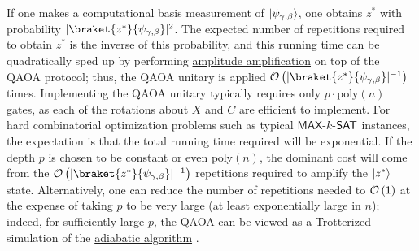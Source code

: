 \begin{refsection}
\begin{itemize}
If one makes a computational basis measurement of $\lvert\psi_{\gamma,\beta}\rangle$, one obtains $z^*$ with probability $|\braket{z^*}{\psi_{\gamma,\beta}}|^2$. The expected number of repetitions required to obtain $z^*$ is the inverse of this probability, and this running time can be quadratically sped up by performing \hyperref[prim:AmpAmp]{amplitude amplification} on top of the QAOA protocol; thus, the QAOA unitary is applied $\bigO{|\braket{z^*}{\psi_{\gamma,\beta}}|^{-1}}$ times. Implementing the QAOA unitary typically requires only $p \cdot \mathrm{poly}(n)$ gates, as each of the rotations about $X$ and $C$ are efficient to implement. For hard combinatorial optimization problems such as typical $\mathsf{MAX}$-$k$-$\mathsf{SAT}$ instances, the expectation is that the total running time required will be exponential. If the depth $p$ is chosen to be constant or even $\mathrm{poly}(n)$, the dominant cost will come from the $\bigO{|\braket{z^*}{\psi_{\gamma,\beta}}|^{-1}}$ repetitions required to amplify the $\lvert z^*\rangle$ state. Alternatively, one can reduce the number of repetitions needed to $\mathcal{O}\left( 1 \right)$ at the expense of taking $p$ to be very large (at least exponentially large in $n$); indeed, for sufficiently large $p$, the QAOA can be viewed as a \hyperref[prim:ProductFormulae]{Trotterized} simulation of the \hyperref[prim:QuantumAdiabaticAlgorithm]{adiabatic algorithm} \cite{farhi2014QAOA}. 


\end{itemize}
\end{refsection}

